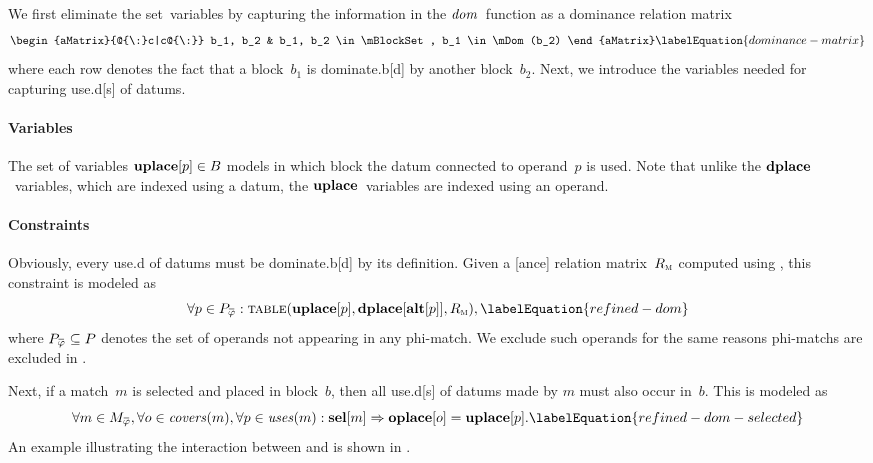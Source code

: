 We first eliminate the set~\glspl{variable} by capturing the information in the
$\operatorname{\textrm{\textit{dom}}}$~\gls{function} as a dominance relation matrix
%
\begin{equation}
  \begin{aMatrix}{@{\:}c|c@{\:}}
      b_1, b_2
    & b_1, b_2 \in \mBlockSet, b_1 \in \mDom(b_2)
  \end{aMatrix}
  \labelEquation{dominance-matrix}
\end{equation}
%
where each row denotes the fact that a \gls{block}~$b_1$ is \gls{dominate.b}[d]
by another \gls{block}~$b_2$.
%
Next, we introduce the \glspl{variable} needed for capturing \gls{use.d}[s] of
\glspl{datum}.


\paragraph{Variables}

The set of \glspl{variable} \mbox{$\mVar{uplace}[p] \in \mBlockSet$} models in
which \gls{block} the \gls{datum} connected to \gls{operand}~$p$ is used.
%
Note that unlike the $\mVar{dplace}$~\glspl{variable}, which are indexed using a
\gls{datum}, the $\mVar{uplace}$~\glspl{variable} are indexed using an
\gls{operand}.


\paragraph{Constraints}

Obviously, every \gls{use.d} of \glspl{datum} must be \gls{dominate.b}[d] by its
definition.
%
Given a [ance] relation matrix~$R_{\textsc{m}}$ computed using
, this \gls{constraint} is modeled as
%
\begin{equation}
  \forall p \in \mPhiOperandCompSet :
  \mTable(\mVar{uplace}[p], \mVar{dplace}[\mVar{alt}[p]], \mDomMatrix),
  \labelEquation{refined-dom}
\end{equation}
%
where \mbox{$\mPhiOperandCompSet \subseteq \mOperandSet$} denotes the set of
\glspl{operand} not appearing in any \gls{phi-match}.
%
We exclude such \glspl{operand} for the same reasons \glspl{phi-match} are
excluded in .

Next, if a \gls{match}~$m$ is selected and placed in \gls{block}~$b$, then all
\gls{use.d}[s] of \glspl{datum} made by $m$ must also occur in~$b$.
%
This is modeled as
%
\begin{equation}
  \forall m \in \mPhiMatchCompSet,
  \forall o \in \mCovers(m),
  \forall p \in \mUses(m) :
  \mVar{sel}[m] \mImp \mVar{oplace}[o] = \mVar{uplace}[p].
  \labelEquation{refined-dom-selected}
\end{equation}
%
An example illustrating the interaction between  and
 is shown in .

